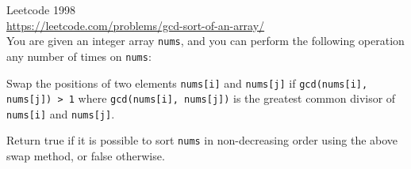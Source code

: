 \begin{ex}
  Leetcode 1998
  \\
  \url{https://leetcode.com/problems/gcd-sort-of-an-array/}
  \\
  You are given an integer array \verb!nums!,
  and you can perform the following operation any number of times on
  \verb!nums!:
  \begin{enumerate}[nosep]
    \li Swap the positions of two elements \verb!nums[i]! and \verb!nums[j]! if
    \verb!gcd(nums[i], nums[j]) > 1! where \verb!gcd(nums[i], nums[j])! is the
    greatest common divisor of \verb!nums[i]! and \verb!nums[j]!.
  \end{enumerate}
  Return true if it is possible to sort \verb!nums! in non-decreasing order
  using the above swap method, or false otherwise.
\end{ex}

